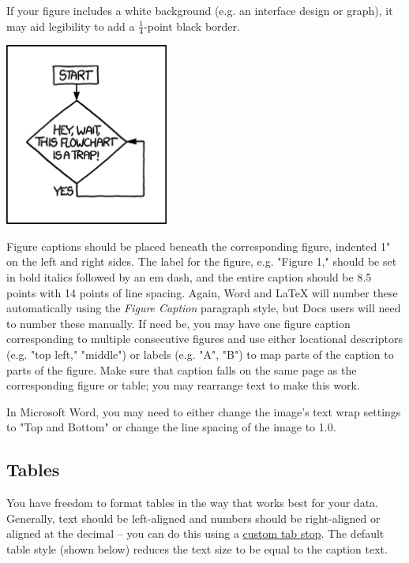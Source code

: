 \documentclass[
	letterpaper, %
]{jdf}
\begin{document}
If your figure includes a white background (e.g. an interface design or graph), it may aid legibility to add a \(\frac{1}{4}\)-point black border.

\begin{jdffigure}
\includegraphics[height=6cm]{Figures/flowchart.png}%
\label{fig:flowchart}%
\end{jdffigure}

Figure captions should be placed beneath the corresponding figure, indented 1" on the left and right sides. The label for the figure, e.g. "Figure 1," should be set in bold italics followed by an em dash, and the entire caption should be 8.5 points with 14 points of line spacing. Again, Word and LaTeX will number these automatically using the \emph{Figure Caption} paragraph style, but Docs users will need to number these manually. If need be, you may have one figure caption corresponding to multiple consecutive figures and use either locational descriptors (e.g. "top left," "middle") or labels (e.g. "A", "B") to map parts of the caption to parts of the figure. Make sure that caption falls on the same page as the corresponding figure or table; you may rearrange text to make this work.

In Microsoft Word, you may need to either change the image’s text wrap settings to "Top and Bottom" or change the line spacing of the image to 1.0.

\subsection{Tables}
You have freedom to format tables in the way that works best for your data. Generally, text should be left-aligned and numbers should be right-aligned or aligned at the decimal – you can do this using a \href{https://practicaltypography.com/tabs-and-tab-stops.html}{custom tab stop}. The default table style (shown below) reduces the text size to be equal to the caption text.
\end{document}
